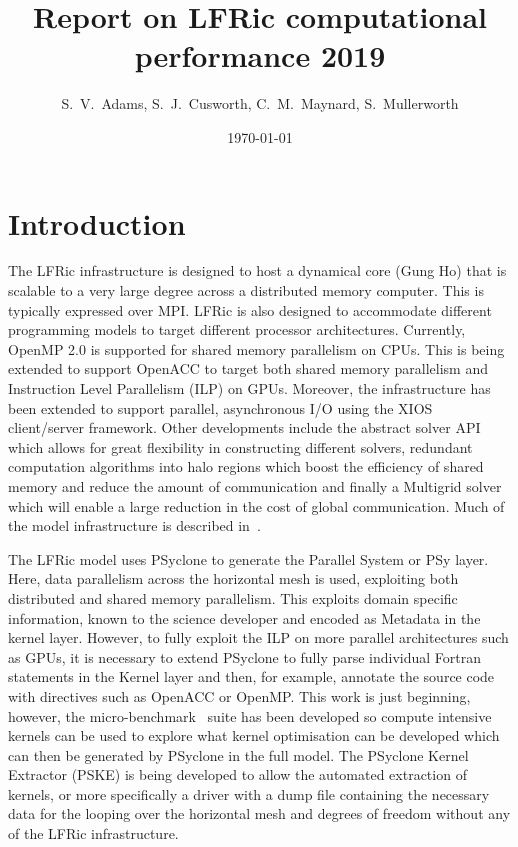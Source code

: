 \documentclass[11pt]{article}
\author{S.~V.~Adams, S.~J.~Cusworth, C.~M.~Maynard, S.~Mullerworth}
\title{Report on LFRic computational performance 2019}
\date{\today}
\begin{document}
\maketitle
\medskip
\section{Introduction\label{sec:intro}}
The LFRic infrastructure is designed to host a dynamical core (Gung Ho)
that is scalable to a very large degree across a distributed memory
computer. This is typically expressed over MPI. LFRic is also designed
to accommodate different programming models to target different
processor architectures. Currently, OpenMP 2.0 is supported for shared
memory parallelism on CPUs. This is being extended to support OpenACC
to target both shared memory parallelism and Instruction Level
Parallelism (ILP) on GPUs. Moreover, the infrastructure has been
extended to support parallel, asynchronous I/O using the XIOS
client/server framework.
Other developments include the abstract solver API which allows for great
flexibility in constructing different solvers, redundant computation
algorithms into halo regions which boost the efficiency of shared
memory and reduce the amount of communication and finally a Multigrid
solver which will enable a large reduction in the cost of global communication.
Much of the model infrastructure is described in~\cite{LFRic}.

The LFRic model uses PSyclone to generate the Parallel System or PSy
layer. Here, data parallelism across the horizontal mesh is used,
exploiting both distributed and shared memory parallelism. This
exploits domain specific information, known to the science developer
and encoded as Metadata in the kernel layer. However, to
fully exploit the ILP on more parallel architectures such as GPUs, it
is necessary to extend PSyclone to fully parse individual Fortran
statements in the Kernel layer and then, for example, annotate the
source code with directives such as OpenACC or OpenMP. This work is just beginning,
however, the micro-benchmark~\cite{lfric-microbenchmarks} suite has been
developed so compute intensive kernels can be used to explore what kernel
optimisation can be developed which can then be generated by PSyclone in the full
model. The PSyclone Kernel Extractor (PSKE) is being developed to
allow the automated extraction of kernels, or more specifically a
driver with a dump file containing the necessary data for the looping
over the horizontal mesh and degrees of freedom without any of the
LFRic infrastructure.
\end{document}
